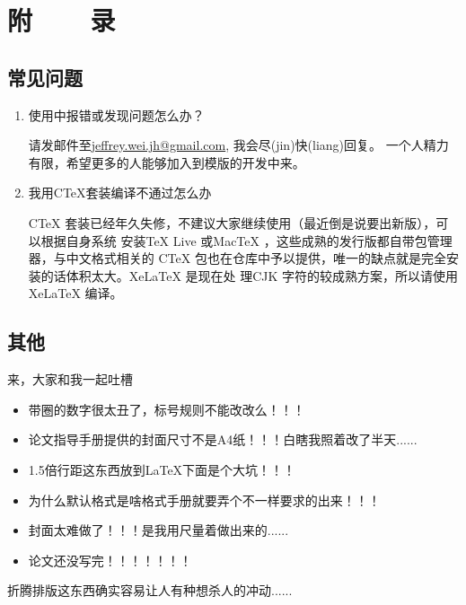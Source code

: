 \chapter{附~~~~录}
\label{chapter-faq}

\section{常见问题}
\begin{enumerate}
\item 使用中报错或发现问题怎么办？
    
    请发邮件至\url{jeffrey.wei.jh@gmail.com}, 我会尽(jin)快(liang)回复。 
    一个人精力有限，希望更多的人能够加入到模版的开发中来。
\item 我用CTeX套装编译不通过怎么办
     
     CTeX 套装已经年久失修，不建议大家继续使用（最近倒是说要出新版），可以根据自身系统
     安装\TeX{} Live 或Mac\TeX{} ，这些成熟的发行版都自带包管理器，与中文格式相关的
     CTeX 包也在仓库中予以提供，唯一的缺点就是完全安装的话体积太大。XeLaTeX 是现在处
     理CJK 字符的较成熟方案，所以请使用XeLaTeX 编译。
    
\end{enumerate}
    

\section{其他}
来，大家和我一起吐槽
\begin{itemize}
\item 带圈的数字很太丑了，标号规则不能改改么！！！
\item 论文指导手册提供的封面尺寸不是A4纸！！！白瞎我照着改了半天......
\item 1.5倍行距这东西放到\LaTeX{}下面是个大坑！！！
\item 为什么默认格式是啥格式手册就要弄个不一样要求的出来！！！
\item 封面太难做了！！！是我用尺量着做出来的......
\item 论文还没写完！！！！！！！
\end{itemize}

折腾排版这东西确实容易让人有种想杀人的冲动......
